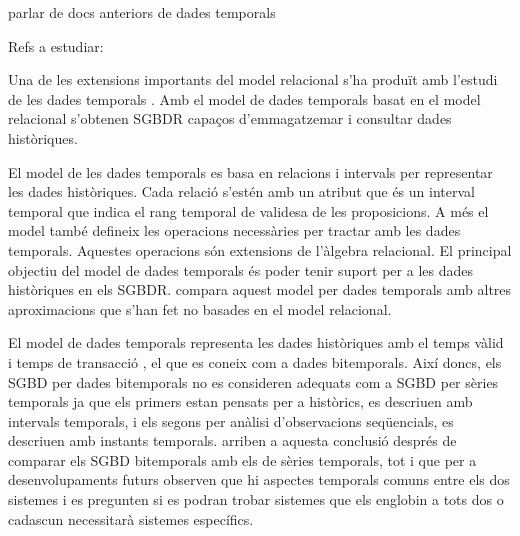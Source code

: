 parlar de docs anteriors de dades temporals

Refs a estudiar:

\cite{jensen99:temporaldata}
\cite{jensen00:thesis}
\cite{jensen98:temporal_database_glossary}
\cite{tansel93:temporal_databases}




Una de les extensions importants del model relacional s'ha produït amb
l'estudi de les dades
temporals \parencite{date02:_tempor_data_relat_model}. Amb el model de
dades temporals basat en el model relacional s'obtenen SGBDR capaços
d'emmagatzemar i consultar dades històriques.

El model de les dades
temporals \parencite{date02:_tempor_data_relat_model} es basa en
relacions i intervals per representar les dades històriques. Cada
relació s'estén amb un atribut que és un interval temporal que indica
el rang temporal de validesa de les proposicions. A més el model també
defineix les operacions necessàries per tractar amb les dades
temporals. Aquestes operacions són extensions de l'àlgebra relacional.
El principal objectiu del model de dades temporals és poder tenir
suport per a les dades històriques en els SGBDR.
\textcite[cap.~28]{date06} compara aquest model per dades temporals
amb altres aproximacions que s'han fet no basades en el model
relacional.



El model de dades temporals representa les dades històriques amb el
temps vàlid i temps de
transacció \parencite[cap.~15]{date02:_tempor_data_relat_model}, el
que es coneix com a dades bitemporals.  Així doncs, els SGBD per dades
bitemporals no es consideren adequats com a SGBD per sèries temporals
ja que els primers estan pensats per a històrics, es descriuen amb
intervals temporals, i els segons per anàlisi d'observacions
seqüencials, es descriuen amb instants temporals.
\textcite{schmidt95} arriben a aquesta conclusió després de comparar
els SGBD bitemporals amb els de sèries temporals, tot i que per a
desenvolupaments futurs observen que hi aspectes temporals comuns
entre els dos sistemes i es pregunten si es podran trobar sistemes que
els englobin a tots dos o cadascun necessitarà sistemes específics.







